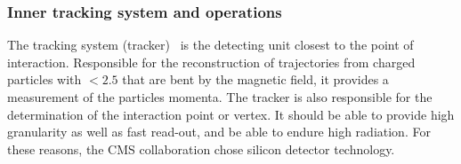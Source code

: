 \subsubsection{Inner tracking system and operations}
\label{sec:TRK}
The tracking system (tracker)~\cite{Chatrchyan:1704291} is the detecting unit closest to the point of interaction. Responsible for the reconstruction of  trajectories from charged particles with \abspsrap $<2.5$ that are bent by the magnetic field, it provides a measurement of the particles momenta. The tracker is also responsible for the determination of the interaction point or vertex. It should be able to provide high granularity as well as fast read-out, and be able to endure high radiation. For these reasons, the CMS collaboration chose silicon detector technology.

